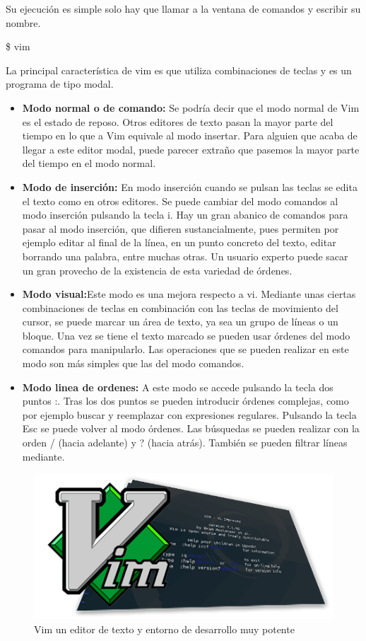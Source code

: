 \documentclass[a4paper,12pt,spanish]{article}
\begin{document}
Su ejecución es simple solo hay que llamar a la ventana de comandos y
escribir su nombre.
\begin{tcolorbox}[colback=red!5!white,colframe=red!75!black,fonttitle=\bfseries]
\$ vim
\end{tcolorbox}

La principal característica de vim es que utiliza combinaciones de
teclas y es un programa de tipo modal.

\begin{itemize}
  \item \textbf{Modo normal o de comando:} Se podría decir que el modo normal de Vim es el estado de reposo. Otros editores de texto pasan la mayor parte del tiempo en lo que a Vim equivale al modo insertar. Para alguien que acaba de llegar a este editor modal, puede parecer extraño que pasemos la mayor parte del tiempo en el modo normal.
  \item \textbf{Modo de inserción:} En modo inserción cuando se pulsan las teclas se edita el texto como en otros editores. Se puede cambiar del modo comandos al modo inserción pulsando la tecla i. Hay un gran abanico de comandos para pasar al modo inserción, que difieren sustancialmente, pues permiten por ejemplo editar al final de la línea, en un punto concreto del texto, editar borrando una palabra, entre muchas otras. Un usuario experto puede sacar un gran provecho de la existencia de esta variedad de órdenes.
  \item \textbf{Modo visual:}Este modo es una mejora respecto a vi. Mediante unas ciertas combinaciones de teclas en combinación con las teclas de movimiento del cursor, se puede marcar un área de texto, ya sea un grupo de líneas o un bloque. Una vez se tiene el texto marcado se pueden usar órdenes del modo comandos para manipularlo. Las operaciones que se pueden realizar en este modo son más simples que las del modo comandos.
  \item \textbf{Modo linea de ordenes:} A este modo se accede pulsando la tecla dos puntos :. Tras los dos puntos se pueden introducir órdenes complejas, como por ejemplo buscar y reemplazar con expresiones regulares. Pulsando la tecla Esc se puede volver al modo órdenes. Las búsquedas se pueden realizar con la orden / (hacia adelante) y ? (hacia atrás). También se pueden filtrar líneas mediante.
\end{itemize}


\begin{figure}[H]
  \centering
  \includegraphics[scale=0.6]{vim}
  \caption{Vim un editor de texto y entorno de desarrollo muy potente }
  \label{fig:vim}
\end{figure}
\end{document}
